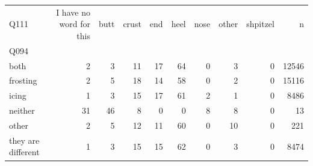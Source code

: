 \begin{tabular}{lrrrrrrrrr}
\toprule
Q111 & I have no word for this & butt & crust & end & heel & nose & other & shpitzel & n \\
Q094 &  &  &  &  &  &  &  &  &  \\
\midrule
both & 2 & 3 & 11 & 17 & 64 & 0 & 3 & 0 & 12546 \\
frosting & 2 & 5 & 18 & 14 & 58 & 0 & 2 & 0 & 15116 \\
icing & 1 & 3 & 15 & 17 & 61 & 2 & 1 & 0 & 8486 \\
neither & 31 & 46 & 8 & 0 & 0 & 8 & 8 & 0 & 13 \\
other & 2 & 5 & 12 & 11 & 60 & 0 & 10 & 0 & 221 \\
they are different & 1 & 3 & 15 & 15 & 62 & 0 & 3 & 0 & 8474 \\
\bottomrule
\end{tabular}
